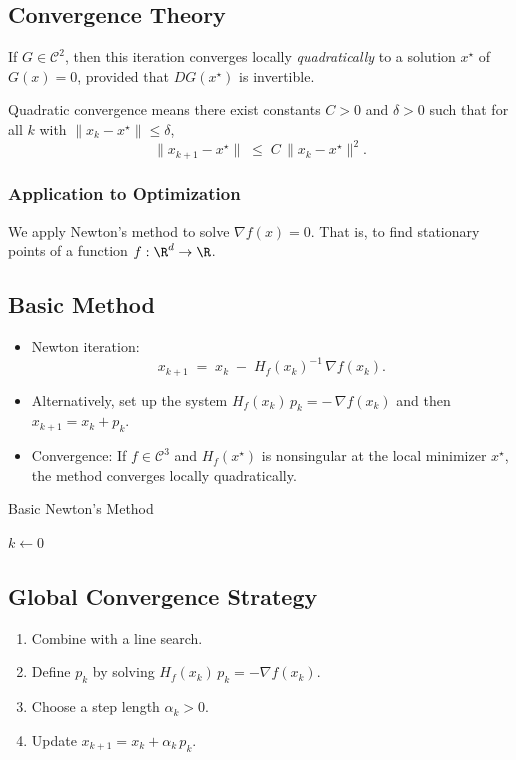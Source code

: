 \subsection*{Convergence Theory}
If \(G\in \mathcal{C}^2\), then this iteration converges locally \emph{quadratically} to
a solution \(x^\star\) of \(G(x) = 0\), provided that \(D G(x^\star)\) is invertible.

\begin{remark}
	Quadratic convergence means there exist constants \(C>0\) and \(\delta>0\) such that for all \(k\) with \(\|x_k - x^\star\|\le \delta\),
	\[
		\|x_{k+1} - x^\star\| \;\le\; C \,\|x_k - x^\star\|^2.
	\]
\end{remark}

\subsubsection*{Application to Optimization}

We apply Newton's method to solve \(\nabla f(x) = 0\). That is, to find stationary points of a function \(f:\R^d \to \R\).

\subsection*{Basic Method}
\begin{itemize}
	\item Newton iteration:
	      \[
		      x_{k+1} \;=\; x_k \;-\; H_f(x_k)^{-1} \,\nabla f(x_k).
	      \]
	\item Alternatively, set up the system \(H_f(x_k)\,p_k = -\,\nabla f(x_k)\) and then \(x_{k+1} = x_k + p_k\).
	\item Convergence: If \(f\in \mathcal{C}^3\) and \(H_f(x^\star)\) is nonsingular at the local minimizer \(x^\star\), the method converges locally quadratically.
\end{itemize}

\begin{algorithm}[H]
	\caption{Basic Newton's Method}
	\label{alg:newton-basic}
	\(k \gets 0\)\;
	\;
\end{algorithm}

\subsection*{Global Convergence Strategy}
\begin{enumerate}
	\item Combine with a line search.
	\item Define \(p_k\) by solving \(H_f(x_k)\,p_k = -\nabla f(x_k)\).
	\item Choose a step length \(\alpha_k > 0\).
	\item Update \(x_{k+1} = x_k + \alpha_k \, p_k\).
\end{enumerate}


